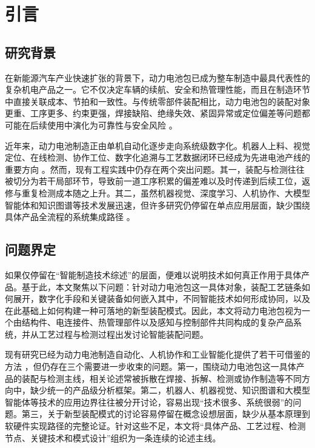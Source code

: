 \section{引言}
\subsection{研究背景}
在新能源汽车产业快速扩张的背景下，动力电池包已成为整车制造中最具代表性的复杂机电产品之一。它不仅决定车辆的续航、安全和热管理性能，而且在制造环节中直接关联成本、节拍和一致性。与传统零部件装配相比，动力电池包的装配对象更重、工序更多、约束更强，焊接缺陷、绝缘失效、紧固异常或定位偏差等问题都可能在后续使用中演化为可靠性与安全风险 \cite{Kumar2025JMEP,Liang2025JRem}。

近年来，动力电池制造正由单机自动化逐步走向系统级数字化。机器人上料、视觉定位、在线检测、协作工位、数字化追溯与工艺数据闭环已经成为先进电池产线的重要方向 \cite{Ayerbe2021AEM,Park2023RSER,Liu2020Access,Tao2020Sustainability}。然而，现有工程实践中仍存在两个突出问题。其一，装配与检测往往被切分为若干局部环节，导致前一道工序积累的偏差难以及时传递到后续工位，返修与重复检测成本随之上升。其二，虽然机器视觉、深度学习、人机协作、大模型智能体和知识图谱等技术发展迅速，但许多研究仍停留在单点应用层面，缺少围绕具体产品全流程的系统集成路径 \cite{Keshvarparast2024JIM,Ma2024AIR}。

\subsection{问题界定}
如果仅停留在“智能制造技术综述”的层面，便难以说明技术如何真正作用于具体产品。基于此，本文聚焦以下问题：针对动力电池包这一具体对象，装配工艺链条如何展开，数字化手段和关键装备如何嵌入其中，不同智能技术如何形成协同，以及在此基础上如何构建一种可落地的新型装配模式。因此，本文将动力电池包视为一个由结构件、电连接件、热管理部件以及感知与控制部件共同构成的复杂产品系统，并从工艺过程与检测过程出发讨论智能装配问题。

现有研究已经为动力电池制造自动化、人机协作和工业智能化提供了若干可借鉴的方法 \cite{Mayoral2023IJPR,Wang2022RCIM,Gasparetto2021RCIM,Zhang2023JMSYKG}，但仍存在三个需要进一步收束的问题。第一，围绕动力电池包这一具体产品的装配与检测主线，相关论述常被拆散在焊接、拆解、检测或协作制造等不同方向中，缺少统一的产品级分析框架。第二，机器人、机器视觉、知识图谱和大模型智能体等技术的应用边界往往被分开讨论，容易出现“技术很多、系统很弱”的问题。第三，关于新型装配模式的讨论容易停留在概念设想层面，缺少从基本原理到软硬件实现路径的完整论证。针对这些不足，本文将“具体产品、工艺过程、检测节点、关键技术和模式设计”组织为一条连续的论述主线。

